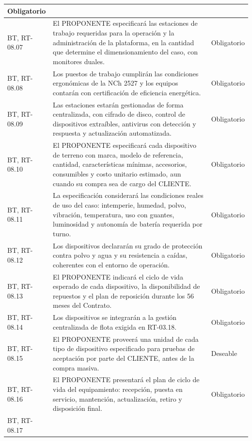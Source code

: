 \begin{longtable}{|L{0.098425\AnchoTablaAnexo}|L{0.814961\AnchoTablaAnexo}|L{0.086614\AnchoTablaAnexo}|}
Obligatorio \\ \hline
{}
BT, RT-08.07 &
El PROPONENTE especificará las estaciones de trabajo requeridas para la operación y la administración de la plataforma, en la cantidad que determine el dimensionamiento del caso, con monitores duales. &
Obligatorio \\ \hline
BT, RT-08.08 &
Los puestos de trabajo cumplirán las condiciones ergonómicas de la NCh 2527 y los equipos contarán con certificación de eficiencia energética. &
Obligatorio \\ \hline
{}
BT, RT-08.09 &
Las estaciones estarán gestionadas de forma centralizada, con cifrado de disco, control de dispositivos extraíbles, antivirus con detección y respuesta y actualización automatizada. &
Obligatorio \\ \hline
BT, RT-08.10 &
El PROPONENTE especificará cada dispositivo de terreno con marca, modelo de referencia, cantidad, características mínimas, accesorios, consumibles y costo unitario estimado, aun cuando su compra sea de cargo del CLIENTE. &
Obligatorio \\ \hline
{}
BT, RT-08.11 &
La especificación considerará las condiciones reales de uso del caso: intemperie, humedad, polvo, vibración, temperatura, uso con guantes, luminosidad y autonomía de batería requerida por turno. &
Obligatorio \\ \hline
BT, RT-08.12 &
Los dispositivos declararán su grado de protección contra polvo y agua y su resistencia a caídas, coherentes con el entorno de operación. &
Obligatorio \\ \hline
{}
BT, RT-08.13 &
El PROPONENTE indicará el ciclo de vida esperado de cada dispositivo, la disponibilidad de repuestos y el plan de reposición durante los 56 meses del Contrato. &
Obligatorio \\ \hline
BT, RT-08.14 &
Los dispositivos se integrarán a la gestión centralizada de flota exigida en RT-03.18. &
Obligatorio \\ \hline
{}
BT, RT-08.15 &
El PROPONENTE proveerá una unidad de cada tipo de dispositivo especificado para pruebas de aceptación por parte del CLIENTE, antes de la compra masiva. &
Deseable \\ \hline
BT, RT-08.16 &
El PROPONENTE presentará el plan de ciclo de vida del equipamiento: recepción, puesta en servicio, mantención, actualización, retiro y disposición final. &
Obligatorio \\ \hline
{}
BT, RT-08.17 &

\end{longtable}
